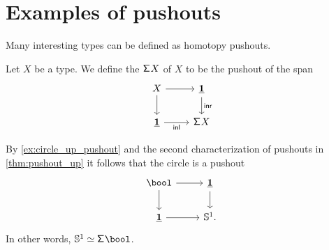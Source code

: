 \begin{comment}
\begin{cor}
Consider two commuting squares
\begin{equation*}
\begin{tikzcd}
S \arrow[r,"g"] \arrow[d,swap,"f"] & B \arrow[d,"j"] & S \arrow[r,"g"] \arrow[d,swap,"f"] & B \arrow[d,"{j'}"] \\
A \arrow[r,swap,"i"] & X & A \arrow[r,swap,"{i'}"] & {X'}
\end{tikzcd}
\end{equation*}
with homotopies $H:i\circ f\htpy j\circ g$ and $H':i'\circ f\htpy j'\circ g$. Furthermore, consider a map
\begin{equation*}
h:X\to X'
\end{equation*}
equipped with
\begin{align*}
K & : h\circ i\htpy i' \\
L & : h\circ j\htpy j' \\
M & : \ct{(h\cdot H)}{(L\cdot g)} \htpy \ct{(K\cdot f)}{H'}.
\end{align*}
If any two of the following three properties hold, then so does the third:
\begin{enumerate}
\item $X$ is a pushout.
\item $X'$ is a pushout.
\item $h$ is an equivalence.
\end{enumerate}
\end{cor}
\end{comment}

\section{Examples of pushouts}
Many interesting types can be defined as homotopy pushouts. 

\begin{defn}
Let $X$ be a type. We define the  $\mathsf{\Sigma}^{} X$ of $X$ to be the pushout of the span
\begin{equation*}
\begin{tikzcd}
X \arrow[r] \arrow[d] & \unit \arrow[d,"\inr"] \\
\unit \arrow[r,swap,"\inl"] & \susp X 
\end{tikzcd}
\end{equation*}
\end{defn}

\begin{eg}\label{eg:circle_pushout}
By \autoref{ex:circle_up_pushout} and the second characterization of pushouts in \autoref{thm:pushout_up} it follows that the circle is a pushout
\begin{equation*}
\begin{tikzcd}
\bool \arrow[r] \arrow[d] & \unit \arrow[d] \\
\unit \arrow[r] & \sphere{1}.
\end{tikzcd}
\end{equation*}
In other words, $\eqv{\sphere{1}}{\susp{\bool}}$. 
\end{eg}

